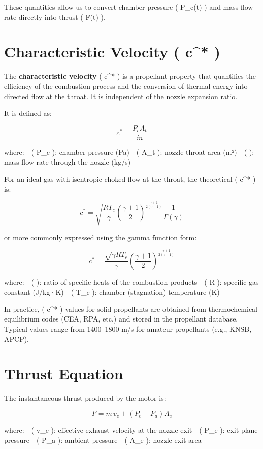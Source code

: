 \documentclass[
  letterpaper,
  DIV=11,
  numbers=noendperiod]{scrreprt}
\begin{document}
These quantities allow us to convert chamber pressure ( P\_c(t) ) and
mass flow rate directly into thrust ( F(t) ).

\section{Characteristic Velocity ( c\^{}*
)}\label{characteristic-velocity-c}

The \textbf{characteristic velocity} ( c\^{}* ) is a propellant property
that quantifies the efficiency of the combustion process and the
conversion of thermal energy into directed flow at the throat. It is
independent of the nozzle expansion ratio.

It is defined as:

\[
c^* = \frac{P_c A_t}{\dot{m}}
\]

where: - ( P\_c ): chamber pressure (Pa) - ( A\_t ): nozzle throat area
(m²) - (  ): mass flow rate through the nozzle (kg/s)

For an ideal gas with isentropic choked flow at the throat, the
theoretical ( c\^{}* ) is:

\[
c^* = \sqrt{ \frac{R T_c}{\gamma} } \left( \frac{\gamma + 1}{2} \right)^{\frac{\gamma + 1}{2(\gamma - 1)}} \frac{1}{\Gamma(\gamma)}
\]

or more commonly expressed using the gamma function form:

\[
c^* = \frac{\sqrt{\gamma R T_c}}{\gamma} \left( \frac{\gamma + 1}{2} \right)^{\frac{\gamma + 1}{2(\gamma - 1)}}
\]

where: - ( \gamma ): ratio of specific heats of the combustion products
- ( R ): specific gas constant (J/kg·K) - ( T\_c ): chamber (stagnation)
temperature (K)

In practice, ( c\^{}* ) values for solid propellants are obtained from
thermochemical equilibrium codes (CEA, RPA, etc.) and stored in the
propellant database. Typical values range from 1400--1800 m/s for
amateur propellants (e.g., KNSB, APCP).

\section{Thrust Equation}\label{thrust-equation}

The instantaneous thrust produced by the motor is:

\[
F = \dot{m} \, v_e + (P_e - P_a) A_e
\]

where: - ( v\_e ): effective exhaust velocity at the nozzle exit - (
P\_e ): exit plane pressure - ( P\_a ): ambient pressure - ( A\_e ):
nozzle exit area
\end{document}
